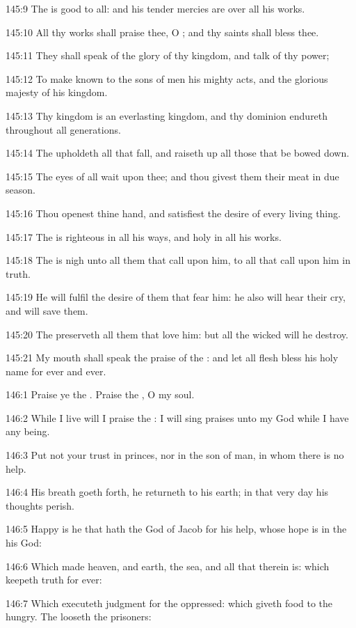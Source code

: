 145:9 The \LORD is good to all: and his tender mercies are over all his works.

145:10 All thy works shall praise thee, O \LORD; and thy saints shall bless thee.

145:11 They shall speak of the glory of thy kingdom, and talk of thy power;

145:12 To make known to the sons of men his mighty acts, and the glorious majesty of his kingdom.

145:13 Thy kingdom is an everlasting kingdom, and thy dominion endureth throughout all generations.

145:14 The \LORD upholdeth all that fall, and raiseth up all those that be bowed down.

145:15 The eyes of all wait upon thee; and thou givest them their meat in due season.

145:16 Thou openest thine hand, and satisfiest the desire of every living thing.

145:17 The \LORD is righteous in all his ways, and holy in all his works.

145:18 The \LORD is nigh unto all them that call upon him, to all that call upon him in truth.

145:19 He will fulfil the desire of them that fear him: he also will hear their cry, and will save them.

145:20 The \LORD preserveth all them that love him: but all the wicked will he destroy.

145:21 My mouth shall speak the praise of the \LORD: and let all flesh bless his holy name for ever and ever.



146:1 Praise ye the \LORD. Praise the \LORD, O my soul.

146:2 While I live will I praise the \LORD: I will sing praises unto my God while I have any being.

146:3 Put not your trust in princes, nor in the son of man, in whom there is no help.

146:4 His breath goeth forth, he returneth to his earth; in that very day his thoughts perish.

146:5 Happy is he that hath the God of Jacob for his help, whose hope is in the \LORD his God:

146:6 Which made heaven, and earth, the sea, and all that therein is: which keepeth truth for ever:

146:7 Which executeth judgment for the oppressed: which giveth food to the hungry. The \LORD looseth the prisoners:

